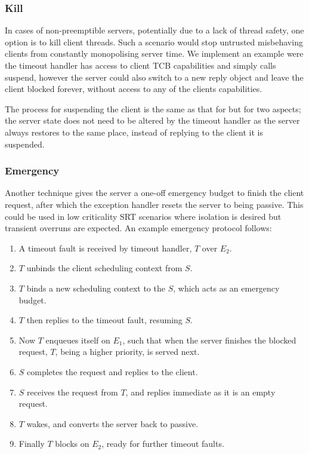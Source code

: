 \subsubsection{Kill}

In cases of non-preemptible servers, potentially due to a lack of thread safety, one option is to
kill client threads. Such a scenario would stop untrusted misbehaving clients from constantly
monopolising server time.  We implement an example were the timeout handler has access to client \gls{TCB}
capabilities and simply calls suspend, however the server could also switch to a new reply object
and leave the client blocked forever, without access to any of the clients capabilities. 

The process for suspending the client is the same as that for  but for two aspects;
the server state does not need to be altered by the timeout handler as the server always 
restores to the same place, instead of replying to the client it is suspended.

\subsubsection{Emergency}

Another technique gives the server a one-off emergency budget to finish the client request, after
which the exception handler resets the server to being passive. This could be used in low
criticality \gls{SRT}
scenarios where isolation is desired but transient overruns are expected.
An example emergency protocol follows:

\begin{enumerate}\label{e:emergency}
    \item A timeout fault is received by timeout handler, $T$ over $E_{2}$.
    \item $T$ unbinds the client scheduling context from $S$.
    \item $T$ binds a new scheduling context to the $S$, which acts as an emergency budget.
    \item $T$ then replies to the timeout fault, resuming $S$.
    \item Now $T$ enqueues itself on $E_{1}$, such that when the server finishes the blocked request,
        $T$, being a higher priority, is served next.
    \item $S$ completes the request and replies to the client.
    \item $S$ receives the request from $T$, and replies immediate as it is an empty request.
    \item $T$ wakes, and converts the server back to passive.
    \item Finally $T$ blocks on $E_{2}$, ready for further timeout faults.
\end{enumerate}

